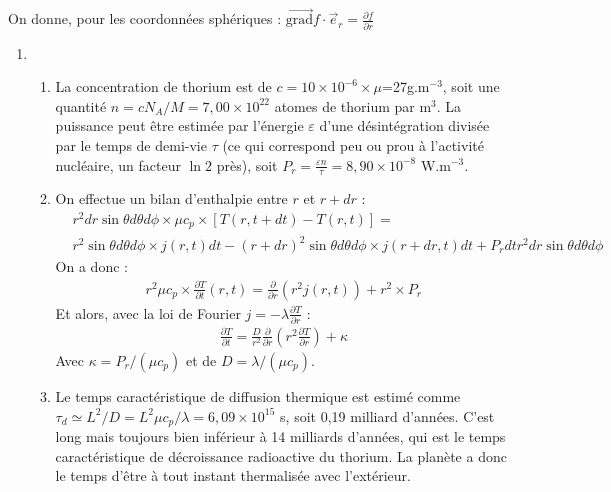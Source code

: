 On donne, pour les coordonnées sphériques : $\vec{\mathrm{grad}} f\cdot \vec{e}_r = \frac{\partial f}{\partial r}$

\newpage

\begin{correction}

\begin{enumerate}

\item

\begin{enumerate}

	\item La concentration de thorium est de $c=10\times10^{-6}\times\mu$=27g.m$^{-3}$, soit une quantité $n=cN_A/M=7,00\times10^{22}$ atomes de thorium par m$^3$. La puissance peut être estimée par l'énergie $\varepsilon$ d'une désintégration divisée par le temps de demi-vie $\tau$ (ce qui correspond peu ou prou à l'activité nucléaire, un facteur $\ln2$ près), soit $P_r=\frac{\varepsilon n}{\tau}=8,90\times10^{-8}$ W.m$^{-3}$.
	
	\item On effectue un bilan d'enthalpie entre $r$ et $r+dr$ :
	\begin{align*}
		& r^2dr\sin\theta d\theta d\phi\times \mu c_p\times[T(r,t+dt)-T(r,t)]= \\
		& r^2\sin\theta d\theta d\phi\times j(r,t)dt-(r+dr)^2\sin\theta d\theta d\phi\times j(r+dr,t)dt + P_rdt r^2dr\sin\theta d\theta d\phi
	\end{align*}
	On a donc :
	\begin{align*}
		 r^2 \mu c_p\times\frac{\partial T}{\partial t}(r,t)= \frac{\partial}{\partial r} \left( r^2j(r,t)\right) + r^2\times P_r
	\end{align*}	
	Et alors, avec la loi de Fourier $j=-\lambda\frac{\partial T}{\partial r}$ :
	\begin{align*}
		\frac{\partial T}{\partial t}=\frac{D}{r^2}\frac{\partial }{\partial r}\left( r^2\frac{\partial T}{\partial r}\right)  + \kappa		
	\end{align*}
Avec $\kappa=P_r/(\mu c_p)$ et de $D=\lambda/(\mu c_p)$.

	\item Le temps caractéristique de diffusion thermique est estimé comme $\tau_d \simeq L^2/D=L^2\mu c_p/\lambda=6,09\times10^{15}$ s, soit 0,19 milliard d'années. C'est long mais toujours bien inférieur à 14 milliards d'années, qui est le temps caractéristique de décroissance radioactive du thorium. La planète a donc le temps d'être à tout instant thermalisée avec l'extérieur. 
	

\end{enumerate}
\end{enumerate}
\end{correction}
